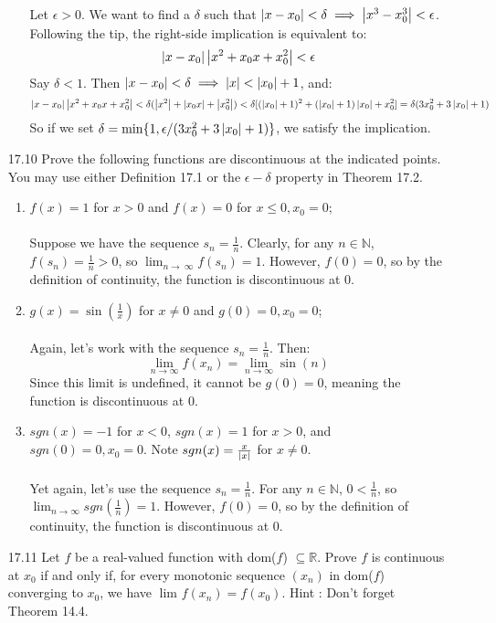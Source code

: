 \begin{enumerate}
\begin{enumerate}
        Let $\epsilon > 0$. We want to find a $\delta$ such that $\left\vert x - x_0 \right\vert < \delta \implies \left\vert x^3 - x_0^3 \right\vert < \epsilon$. Following the tip, the right-side implication is equivalent to:
        $$\left\vert x - x_0 \right\vert \left\vert x^2 + x_0x + x_0^2 \right\vert < \epsilon$$
        Say $\delta < 1$. Then $\left\vert x - x_0 \right\vert < \delta \implies \left\vert x \right\vert < \left\vert x_0 \right\vert + 1$, and:
        $$\left\vert x - x_0 \right\vert \left\vert x^2 + x_0x + x_0^2 \right\vert < \delta(\left\vert x^2 \right\vert + \left\vert x_0x \right\vert + \left\vert x_0^2 \right\vert) < \delta[(\left\vert x_0 \right\vert + 1)^2 + (\left\vert x_0 \right\vert + 1) \left\vert x_0 \right\vert + x_0^2] = \delta(3x_0^2 + 3 \left\vert x_0 \right\vert + 1)$$
        So if we set $\delta = \min \{1, \epsilon / (3x_0^2 + 3 \left\vert x_0 \right\vert + 1) \}$, we satisfy the implication.
    \end{enumerate}
  \item [17.10]
    Prove the following functions are discontinuous at the indicated points. You may use either Definition 17.1 or the $\epsilon-\delta$ property in Theorem 17.2.
    \begin{enumerate}
      \item $f(x) = 1$ for $x > 0$ and $f(x) = 0$ for $x \leq 0, x_0 = 0$;\\\\

        Suppose we have the sequence $s_n = \frac{1}{n}$. Clearly, for any $n \in \mathds{N}$, $f(s_n) = \frac{1}{n} > 0$, so $\lim_{n \to\ \infty} f(s_n) = 1$. However, $f(0) = 0$, so by the definition of continuity, the function is discontinuous at $0$.
        
      \item $g(x) = \sin(\frac{1}{x})$ for $x \neq 0$ and $g(0) = 0, x_0 = 0$;\\\\

        Again, let's work with the sequence $s_n = \frac{1}{n}$. Then:
        $$\lim_{n \to \infty} f(x_n) = \lim_{n \to \infty} \sin(n)$$
        Since this limit is undefined, it cannot be $g(0) = 0$, meaning the function is discontinuous at $0$.
      \item $sgn(x) = -1$ for $x < 0$, $sgn(x) = 1$ for $x > 0$, and $sgn(0) = 0, x_0 = 0$. Note $sgn(x) = \frac{x}{\left\vert x \right\vert}$ for $x \neq 0$.\\\\
        
        Yet again, let's use the sequence $s_n = \frac{1}{n}$. For any $n \in \mathds{N}$, $0 < \frac{1}{n}$, so $\lim_{n \to \infty} sgn(\frac{1}{n}) = 1$. However, $f(0) = 0$, so by the definition of continuity, the function is discontinuous at $0$.
    \end{enumerate}
  \item [17.11]
    Let $f$ be a real-valued function with dom($f$) $\subseteq \mathds{R}$. Prove $f$ is continuous at $x_0$ if and only if, for every monotonic sequence $(x_n)$ in dom($f$) converging to $x_0$, we have $\lim_{} f(x_n) = f(x_0)$. Hint : Don't forget Theorem 14.4.\\\\


\end{enumerate}
